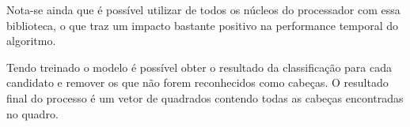 Nota-se ainda que é possível utilizar de todos os núcleos do processador com essa biblioteca, o que traz um impacto bastante positivo na performance temporal do algoritmo.

Tendo treinado o modelo é possível obter o resultado da classificação para cada candidato e remover os que não forem reconhecidos como cabeças. O resultado final do processo é um vetor de quadrados contendo todas as cabeças encontradas no quadro.
